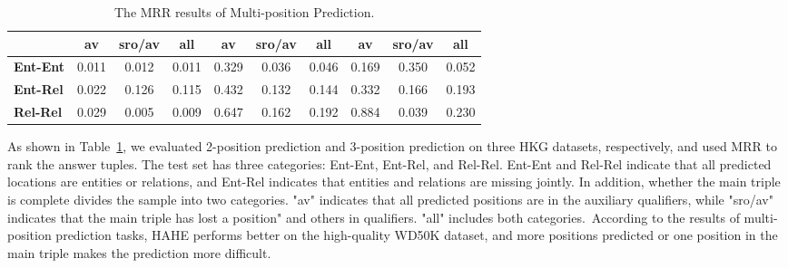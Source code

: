 \documentclass[11pt]{article}
\begin{document}
\begin{table}[ht]
{\begin{tabular}{l|ccc|ccc|ccc}
\textbf{} & \multicolumn{1}{c}{\textbf{av}} & \multicolumn{1}{c}{\textbf{sro/av}} & \multicolumn{1}{c|}{\textbf{all}} & \multicolumn{1}{c}{\textbf{av}} & \multicolumn{1}{c}{\textbf{sro/av}} & \multicolumn{1}{c|}{\textbf{all}} & \multicolumn{1}{c}{\textbf{av}} & \multicolumn{1}{c}{\textbf{sro/av}} & \multicolumn{1}{c}{\textbf{all}} \\ \midrule
\textbf{Ent-Ent}   & 0.011                                   & 0.012                                  & 0.011                 & 0.329                                 & 0.036                                  & 0.046                 & 0.169                                   & 0.350                                  & 0.052                                     \\
\textbf{Ent-Rel}   & 0.022                                   & 0.126                                  & 0.115                 & 0.432                                   & 0.132                                  & 0.144                 & 0.332                                   & 0.166                                  & 0.193                                     \\
\textbf{Rel-Rel}   & 0.029                                   & 0.005                                  & 0.009              & 0.647                                   & 0.162                                  & 0.192                 & 0.884                                   & 0.039                                  & 0.230                                     \\ \bottomrule
\end{tabular}}
	\caption{The MRR results of Multi-position Prediction.}
	\label{tabel_multi}
\end{table}


As shown in Table~\ref{tabel_multi}, we evaluated 2-position prediction and 3-position prediction on three HKG datasets, respectively, and used MRR to rank the answer tuples. The test set has three categories: Ent-Ent, Ent-Rel, and Rel-Rel. Ent-Ent and Rel-Rel indicate that all predicted locations are entities or relations, and Ent-Rel indicates that entities and relations are missing jointly. In addition, whether the main triple is complete divides the sample into two categories. "av" indicates that all predicted positions are in the auxiliary qualifiers, while "sro/av" indicates that the main triple has lost a position" and others in qualifiers. "all" includes both categories. According to the results of multi-position prediction tasks, HAHE performs better on the high-quality WD50K dataset, and more positions predicted or one position in the main triple makes the prediction more difficult. 
\end{document}
